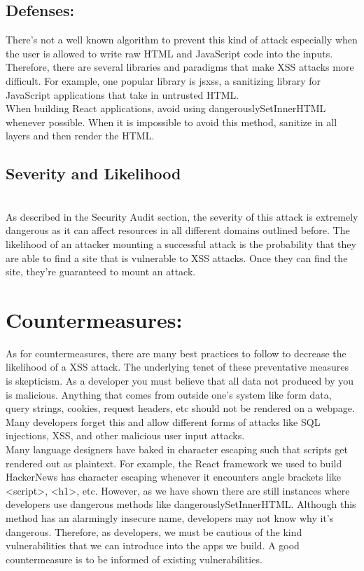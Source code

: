 \documentclass[conference]{IEEEtran}
\begin{document}
\subsection{Defenses:}

There's not a well known algorithm to prevent this kind of attack especially when the user is allowed to write raw HTML and JavaScript code into the inputs. Therefore, there are several libraries and paradigms that make XSS attacks more difficult. For example, one popular library is jsxss, a sanitizing library for JavaScript applications that take in untrusted HTML.\\

When building React applications, avoid using dangerouslySetInnerHTML whenever possible. When it is impossible to avoid this method, sanitize in all layers and then render the HTML.

\subsection{Severity and Likelihood}\\
As described in the Security Audit section, the severity of this attack is extremely dangerous as it can affect resources in all different domains outlined before. The likelihood of an attacker mounting a successful attack is the probability that they are able to find a site that is vulnerable to XSS attacks. Once they can find the site, they're guaranteed to mount an attack.
\section{Countermeasures:}

As for countermeasures, there are many best practices to follow to decrease the likelihood of a XSS attack. The underlying tenet of these preventative measures is skepticism. As a developer you must believe that all data not produced by you is malicious. Anything that comes from outside one's system like form data, query strings, cookies, request headers, etc should not be rendered on a webpage. Many developers forget this and allow different forms of attacks like SQL injections, XSS, and other malicious user input attacks.\\
Many language designers have baked in character escaping such that scripts get rendered out as plaintext. For example, the React framework we used to build HackerNews has character escaping whenever it encounters angle brackets like <script>, <h1>, etc. However, as we have shown there are still instances where developers use dangerous methods like dangerouslySetInnerHTML. Although this method has an alarmingly insecure name, developers may not know why it’s dangerous. Therefore, as developers, we must be cautious of the kind vulnerabilities that we can introduce into the apps we build. A good countermeasure is to be informed of existing vulnerabilities.
\end{document}
